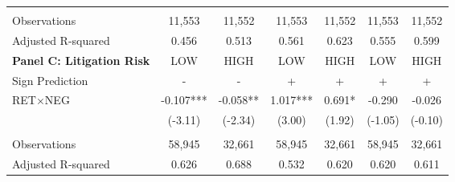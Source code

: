 \begin{table}[H]
\begin{tabular}{lcccccc}
	 &  &  &  &  &  &  \\
    \multicolumn{1}{l}{Observations} & 11,553 & 11,552 & 11,553 & 11,552 & 11,553 & 11,552 \\
    \multicolumn{1}{l}{Adjusted R-squared} & 0.456 & 0.513 & 0.561 & 0.623 & 0.555 & 0.599 \\
    \midrule
    \multicolumn{1}{l}{\textbf{Panel C: Litigation Risk}} & LOW & HIGH & LOW & HIGH & LOW & HIGH \\
    \cmidrule{2-7}
     Sign Prediction & - & - & + & + & + & + \\
     \multicolumn{1}{l}{RET$\times$NEG} & -0.107*** & -0.058** & 1.017*** & 0.691* & -0.290 & -0.026 \\
     \multicolumn{1}{l}{} & (-3.11) & (-2.34) & (3.00) & (1.92) & (-1.05) & (-0.10) \\
	 &  &  &  &  &  &  \\
    Observations & 58,945 & 32,661 & 58,945 & 32,661 & 58,945 & 32,661 \\
    Adjusted R-squared & 0.626 & 0.688 & 0.532 & 0.620 & 0.620 & 0.611 \\
    
    \bottomrule
    \bottomrule
    \end{tabular}%
\end{table}%
